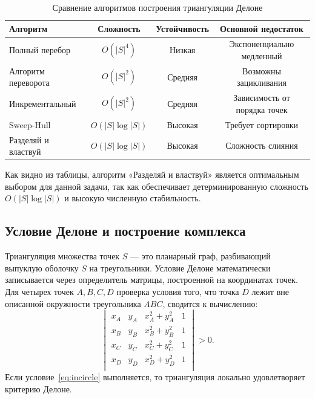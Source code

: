 \documentclass{misisarticle}
\begin{document}
\begin{table}[htbp]
  \caption{Сравнение алгоритмов построения триангуляции Делоне}
  \label{tab:algo_compare}
  \centering
  \begin{tabular}{lccc}
    \toprule
    \textbf{Алгоритм} & \textbf{Сложность} & \textbf{Устойчивость} & \textbf{Основной недостаток} \\
    \midrule
    Полный перебор & \(O(|S|^4)\) & Низкая & Экспоненциально медленный \\
    Алгоритм переворота & \(O(|S|^2)\) & Средняя & Возможны зацикливания \\
    Инкрементальный & \(O(|S|^2)\) & Средняя & Зависимость от порядка точек \\
    Sweep-Hull & \(O(|S| \log |S|)\) & Высокая & Требует сортировки \\
    Разделяй и властвуй & \(O(|S| \log |S|)\) & Высокая & Сложность слияния \\
    \bottomrule
  \end{tabular}
\end{table}

Как видно из таблицы, алгоритм «Разделяй и властвуй» \cite{lee1980} является оптимальным выбором для данной задачи, 
так как обеспечивает детерминированную сложность \(O(|S| \log |S|)\) и высокую численную стабильность.

\subsection{Условие Делоне и построение комплекса}

Триангуляция множества точек \(S\) — это планарный граф, разбивающий выпуклую оболочку \(S\) на треугольники. Условие Делоне 
математически записывается через определитель матрицы, построенной на координатах точек. Для четырех точек \(A, B, C, D\) проверка 
условия того, что точка \(D\) лежит вне описанной окружности треугольника \(ABC\), сводится к вычислению:
\begin{equation}
  \begin{vmatrix}
    x_A & y_A & x_A^2 + y_A^2 & 1 \\
    x_B & y_B & x_B^2 + y_B^2 & 1 \\
    x_C & y_C & x_C^2 + y_C^2 & 1 \\
    x_D & y_D & x_D^2 + y_D^2 & 1 \\
  \end{vmatrix} > 0.
  \label{eq:incircle}
\end{equation}
Если условие~\eqref{eq:incircle} выполняется, то триангуляция локально удовлетворяет критерию Делоне.
\end{document}
